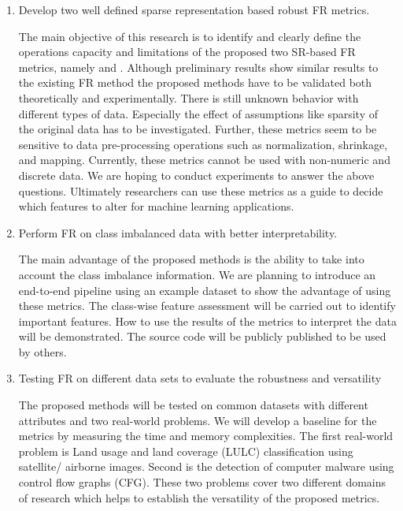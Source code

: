 \documentclass[11pt]{article}
\begin{document}
\begin{enumerate}
    \item Develop two well defined sparse representation based robust FR metrics.
    
    The main objective of this research is to identify and clearly define the operations capacity and limitations of the proposed two SR-based FR metrics, namely  and . Although preliminary results show similar results to the existing FR method the proposed methods have to be validated both theoretically and experimentally. There is still unknown behavior with different types of data.  Especially the effect of assumptions like sparsity of the original data has to be investigated. Further, these metrics seem to be sensitive to data pre-processing operations such as normalization, shrinkage, and mapping. Currently, these metrics cannot be used with non-numeric and discrete data. We are hoping to conduct experiments to answer the above questions. Ultimately researchers can use these metrics as a guide to decide which features to alter for machine learning applications.
    
    \item Perform FR on class imbalanced data with better interpretability.
    
    The main advantage of the proposed methods is the ability to take into account the class imbalance information. We are planning to introduce an end-to-end pipeline using an example dataset to show the advantage of using these metrics. The class-wise feature assessment will be carried out to identify important features.  How to use the results of the metrics to interpret the data will be demonstrated. The source code will be publicly published to be used by others.
    
    \item Testing FR on different data sets to evaluate the robustness and versatility
    
    The proposed methods will be tested on common datasets with different attributes and two real-world problems. We will develop a baseline for the metrics by measuring the time and memory complexities. The first real-world problem is Land usage and land coverage (LULC) classification using satellite/ airborne images. Second is the detection of computer malware using control flow graphs (CFG). These two problems cover two different domains of research which helps to establish the versatility of the proposed metrics. 
    
\end{enumerate}
\end{document}
